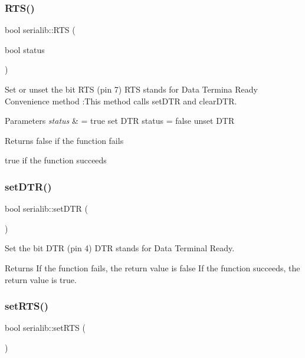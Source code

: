 \subsubsection{\texorpdfstring{R\+T\+S()}{RTS()}}
{\footnotesize\ttfamily bool serialib\+::\+R\+TS (\begin{DoxyParamCaption}\item[{bool}]{status }\end{DoxyParamCaption})}



Set or unset the bit R\+TS (pin 7) R\+TS stands for Data Termina Ready Convenience method \+:This method calls set\+D\+TR and clear\+D\+TR. 


\begin{DoxyParams}{Parameters}
{\em status} & = true set D\+TR status = false unset D\+TR \\
\hline
\end{DoxyParams}
\begin{DoxyReturn}{Returns}
false if the function fails 

true if the function succeeds 
\end{DoxyReturn}
\mbox{\label{classserialib_a7564b9e28b1b50675d9d6d3fabc896c0}} 
\subsubsection{\texorpdfstring{set\+D\+T\+R()}{setDTR()}}
{\footnotesize\ttfamily bool serialib\+::set\+D\+TR (\begin{DoxyParamCaption}{ }\end{DoxyParamCaption})}



Set the bit D\+TR (pin 4) D\+TR stands for Data Terminal Ready. 

\begin{DoxyReturn}{Returns}
If the function fails, the return value is false If the function succeeds, the return value is true. 
\end{DoxyReturn}
\mbox{\label{classserialib_a21767ffe86a76f300a71c496fbcc26a1}} 
\subsubsection{\texorpdfstring{set\+R\+T\+S()}{setRTS()}}
{\footnotesize\ttfamily bool serialib\+::set\+R\+TS (\begin{DoxyParamCaption}{ }\end{DoxyParamCaption})}



